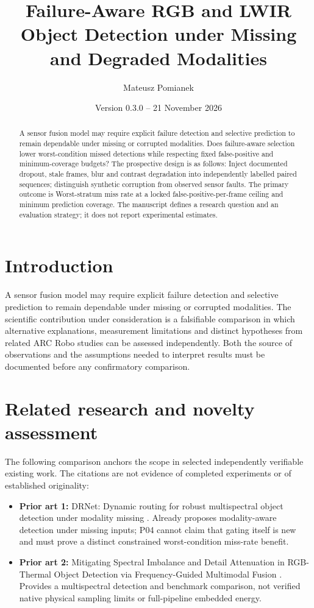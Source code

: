 \documentclass[11pt,a4paper]{article}
\title{Failure-Aware RGB and LWIR Object Detection under Missing and Degraded Modalities}
\author{Mateusz Pomianek}
\date{Version 0.3.0 -- 21 November 2026}
\begin{document}
\maketitle

\begin{abstract}
A sensor fusion model may require explicit failure detection and selective prediction to remain dependable under missing or corrupted modalities. Does failure-aware selection lower worst-condition missed detections while respecting fixed false-positive and minimum-coverage budgets? The prospective design is as follows: Inject documented dropout, stale frames, blur and contrast degradation into independently labelled paired sequences; distinguish synthetic corruption from observed sensor faults. The primary outcome is Worst-stratum miss rate at a locked false-positive-per-frame ceiling and minimum prediction coverage. The manuscript defines a research question and an evaluation strategy; it does not report experimental estimates.
\end{abstract}

\section{Introduction}
A sensor fusion model may require explicit failure detection and selective prediction to remain dependable under missing or corrupted modalities. The scientific contribution under consideration is a falsifiable comparison in which alternative explanations, measurement limitations and distinct hypotheses from related ARC Robo studies can be assessed independently. Both the source of observations and the assumptions needed to interpret results must be documented before any confirmatory comparison.

\section{Related research and novelty assessment}
The following comparison anchors the scope in selected independently verifiable existing work. The citations are not evidence of completed experiments or of established originality:
\begin{itemize}
\item \textbf{Prior art 1:} DRNet: Dynamic routing for robust multispectral object detection under modality missing \cite{source1}. Already proposes modality-aware detection under missing inputs; P04 cannot claim that gating itself is new and must prove a distinct constrained worst-condition miss-rate benefit.
\item \textbf{Prior art 2:} Mitigating Spectral Imbalance and Detail Attenuation in RGB-Thermal Object Detection via Frequency-Guided Multimodal Fusion \cite{source2}. Provides a multispectral detection and benchmark comparison, not verified native physical sampling limits or full-pipeline embedded energy.
\end{itemize}
\end{document}
